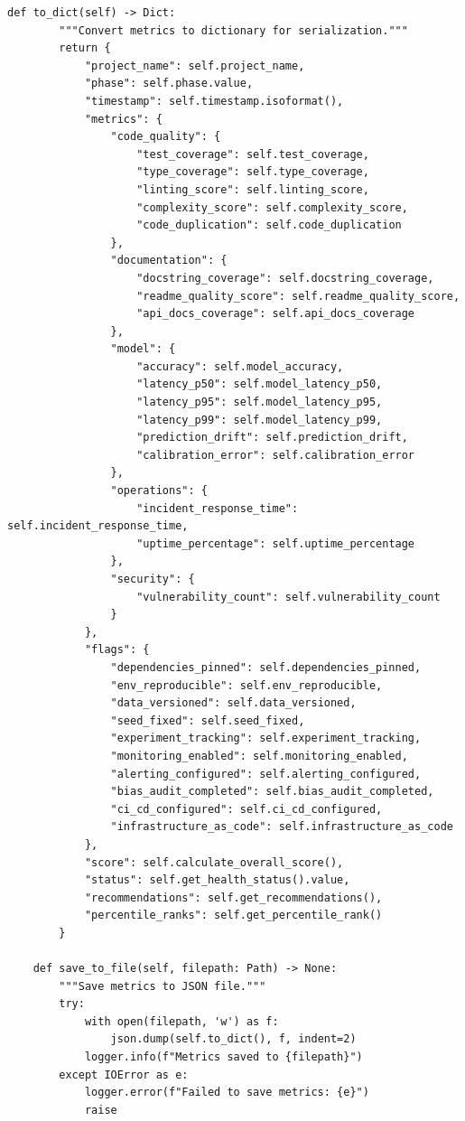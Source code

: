 \begin{lstlisting}[style=python, caption={Comprehensive project health metrics framework with 15+ dimensions}]
    def to_dict(self) -> Dict:
        """Convert metrics to dictionary for serialization."""
        return {
            "project_name": self.project_name,
            "phase": self.phase.value,
            "timestamp": self.timestamp.isoformat(),
            "metrics": {
                "code_quality": {
                    "test_coverage": self.test_coverage,
                    "type_coverage": self.type_coverage,
                    "linting_score": self.linting_score,
                    "complexity_score": self.complexity_score,
                    "code_duplication": self.code_duplication
                },
                "documentation": {
                    "docstring_coverage": self.docstring_coverage,
                    "readme_quality_score": self.readme_quality_score,
                    "api_docs_coverage": self.api_docs_coverage
                },
                "model": {
                    "accuracy": self.model_accuracy,
                    "latency_p50": self.model_latency_p50,
                    "latency_p95": self.model_latency_p95,
                    "latency_p99": self.model_latency_p99,
                    "prediction_drift": self.prediction_drift,
                    "calibration_error": self.calibration_error
                },
                "operations": {
                    "incident_response_time": self.incident_response_time,
                    "uptime_percentage": self.uptime_percentage
                },
                "security": {
                    "vulnerability_count": self.vulnerability_count
                }
            },
            "flags": {
                "dependencies_pinned": self.dependencies_pinned,
                "env_reproducible": self.env_reproducible,
                "data_versioned": self.data_versioned,
                "seed_fixed": self.seed_fixed,
                "experiment_tracking": self.experiment_tracking,
                "monitoring_enabled": self.monitoring_enabled,
                "alerting_configured": self.alerting_configured,
                "bias_audit_completed": self.bias_audit_completed,
                "ci_cd_configured": self.ci_cd_configured,
                "infrastructure_as_code": self.infrastructure_as_code
            },
            "score": self.calculate_overall_score(),
            "status": self.get_health_status().value,
            "recommendations": self.get_recommendations(),
            "percentile_ranks": self.get_percentile_rank()
        }

    def save_to_file(self, filepath: Path) -> None:
        """Save metrics to JSON file."""
        try:
            with open(filepath, 'w') as f:
                json.dump(self.to_dict(), f, indent=2)
            logger.info(f"Metrics saved to {filepath}")
        except IOError as e:
            logger.error(f"Failed to save metrics: {e}")
            raise


\end{lstlisting}
